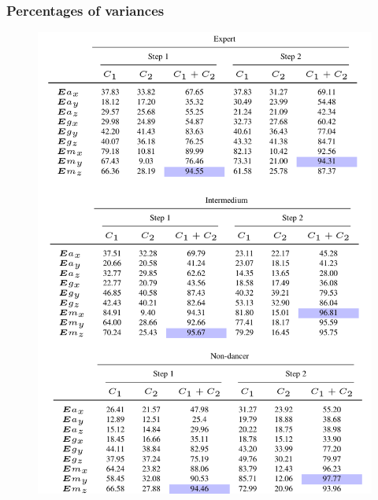 \documentclass{beamer}
\begin{document}
\begin{frame}
\frametitle{Percentages of variances}
\vspace{-0.6cm}
\begin{figure}
\includegraphics[scale=0.15]{tables_v1} \\

\end{figure}  
\end{frame}
\end{document}
